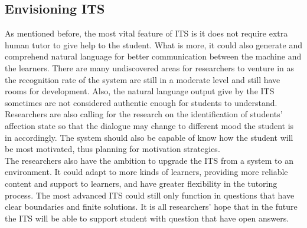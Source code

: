 \documentclass[sigconf]{acmart}
\begin{document}
\subsection{Envisioning ITS}
As mentioned before, the most vital feature of ITS is it does not require extra human tutor to give help to the student. What is more, it could also generate and comprehend natural language for better communication between the machine and the learners. There are many undiscovered areas for researchers to venture in as the recognition rate of the system are still in a moderate level and still have rooms for development. Also, the natural language output give by the ITS sometimes are not considered authentic enough for students to understand. Researchers are also calling for the research on the identification of students' affection state so that the dialogue may change to different mood the student is in accordingly. The system should also be capable of know how the student will be most motivated, thus planning for motivation strategies.\\
The researchers also have the ambition to upgrade the ITS from a system to an environment. It could adapt to more kinds of learners, providing more reliable content and support to learners, and have greater flexibility in the tutoring process. The most advanced ITS could still only function in questions that have clear boundaries and finite solutions. It is all researchers' hope that in the future the ITS will be able to support student with question that have open answers\cite{Hofer2012}.
\end{document}
